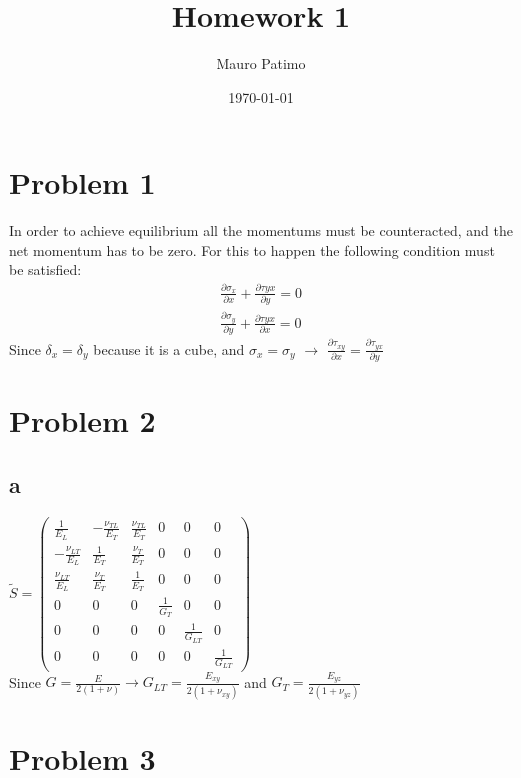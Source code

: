 \documentclass{article}
\begin{document}
\title{Homework 1}
\author{Mauro Patimo}
\date{\today}

\maketitle

\section{Problem 1}
In order to achieve equilibrium all the momentums must be counteracted, and the net momentum has to be zero. For this to happen the following condition must be satisfied:
\begin{align*}
\frac{\partial{\sigma_x}}{\partial{x}}+\frac{\partial \tau{{yx}}}{\partial y} = 0 \\
\frac{\partial{\sigma_y}}{\partial{y}}+\frac{\partial \tau{{yx}}}{\partial x} = 0
\end{align*}
Since $\delta_x=\delta_y$ because it is a cube, and $\sigma_x=\sigma_y$ $\rightarrow$ $\frac{\partial \tau_{xy}}{\partial x}= \frac{\partial \tau_{yx}}{\partial y}$

\section{Problem 2}
\subsection*{a}
$\widetilde{S}
= \begin{pmatrix}
    \frac{1}{E_L} & -\frac{\nu_{TL}}{E_T} & \frac{\nu_{TL}}{E_T} & 0 & 0 & 0\\
    -\frac{\nu_{LT}}{E_L} & \frac{1}{E_T} & \frac{\nu_{T}}{E_T} & 0 & 0 & 0\\
    \frac{\nu_{LT}}{E_L} & \frac{\nu_{T}}{E_T} & \frac{1}{E_T} & 0 & 0 & 0\\
    0 & 0 & 0 & \frac{1}{G_{T}} & 0 & 0\\
    0 & 0 & 0 & 0 & \frac{1}{G_{LT}} & 0\\
    0 & 0 & 0 & 0 & 0 & \frac{1}{G_{LT}}
\end{pmatrix}$ \\
Since $G=\frac{E}{2(1+\nu)} \rightarrow G_{LT}=\frac{E_{xy}}{2(1+\nu_{xy})}$ and $G_{T}=\frac{E_{yz}}{2(1+\nu_{yz})}$
\section*{Problem 3}
\end{document}
